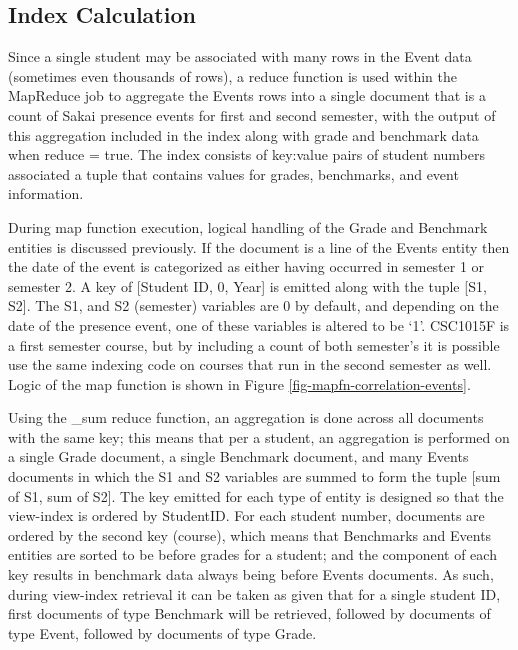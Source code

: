 \subsection{Index Calculation}
Since a single student may be associated with many rows in the Event data (sometimes even thousands of rows), a reduce function is used within the MapReduce job to aggregate the Events rows into a single document that is a count of Sakai presence events for first and second semester, with the output of this aggregation included in the index along with grade and benchmark data when reduce = true. The index consists of key:value pairs of student numbers associated a tuple that contains values for grades, benchmarks, and event information.

During map function execution, logical handling of the Grade and Benchmark entities is discussed previously. If the document is a line of the Events entity then the date of the event is categorized as either having occurred in semester 1 or semester 2. A key of [Student ID, 0, Year] is emitted along with the tuple [S1, S2]. The S1, and S2 (semester) variables are 0 by default, and depending on the date of the presence event, one of these variables is altered to be `1'. CSC1015F is a first semester course, but by including a count of both semester's it is possible use the same indexing code on courses that run in the second semester as well. Logic of the map function is shown in Figure \ref{fig-mapfn-correlation-events}.

Using the \_sum reduce function, an aggregation is done across all documents with the same key; this means that per a student, an aggregation is performed on a single Grade document, a single Benchmark document, and many Events documents in which the S1 and S2 variables are summed to form the tuple [sum of S1, sum of S2]. The key emitted for each type of entity is designed so that the view-index is ordered by StudentID. For each student number, documents are ordered by the second key (course), which means that Benchmarks and Events entities are sorted to be before grades for a student; and the  component of each key results in benchmark data always being before Events documents. As such, during view-index retrieval it can be taken as given that for a single student ID, first documents of type Benchmark will be retrieved, followed by documents of type Event, followed by documents of type Grade.



